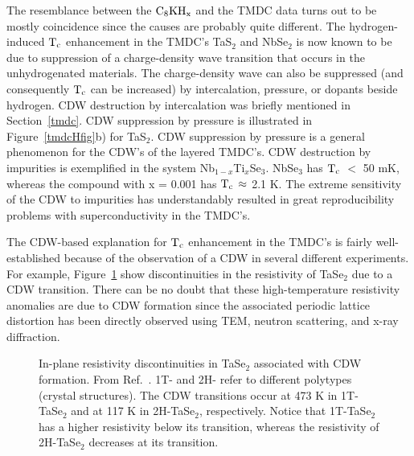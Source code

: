         The resemblance between the $\rm C_8KH_{x}$ and the TMDC data turns
out to be mostly coincidence since the causes are probably quite different.
The  hydrogen-induced  $\rm  T_c$ enhancement  in  the TMDC's  TaS$_2$  and
NbSe$_2$ is now  known to be  due to suppression of  a charge-density  wave
transition        that      occurs       in          the     unhydrogenated
materials.\cite{murphy75,friend79}  The charge-density  wave  can  also  be
suppressed (and consequently $\rm T_c$ can  be increased) by intercalation,
pressure,  or dopants  beside  hydrogen.\cite{friend79}  CDW destruction by
intercalation was briefly mentioned in Section~\ref{tmdc}.  CDW suppression
by pressure  is  illustrated  in Figure~\ref{tmdcHfig}b) for  TaS$_2$.  CDW
suppression  by pressure  is  a general phenomenon  for  the  CDW's  of the
layered TMDC's.\cite{friend79} CDW destruction by impurities is exemplified
in the system  Nb$_{1-x}$Ti$_x$Se$_3$.  NbSe$_3$ has  $\rm T_c$  $<$ 50 mK,
whereas  the compound  with  x  =  0.001 has   $\rm  T_c \,  \approx$   2.1
K.\cite{fuller81}  The  extreme sensitivity of   the CDW to impurities  has
understandably  resulted  in   great    reproducibility     problems   with
superconductivity in the TMDC's.\cite{fuller81}  

        The  CDW-based explanation for $\rm T_c$  enhancement in the TMDC's
is fairly well-established because of the  observation of a  CDW in several
different    experiments.    For   example,  Figure~\ref{tase2resist}  show
discontinuities    in   the   resistivity   of  TaSe$_2$     due  to a  CDW
transition.\cite{wilson74}     There    can    be  no   doubt    that these
high-temperature resistivity anomalies are due to CDW  formation  since the
associated periodic lattice  distortion   has been directly  observed using
TEM, neutron scattering, and x-ray diffraction.\cite{friend79,wilson74}

\begin{figure}
\vspace{15cm}
\caption[Resistivity discontinuities in TaSe$_2$ associated with CDW
formation]{In-plane resistivity discontinuities in TaSe$_2$ associated with
CDW formation.  From Ref.~\cite{wilson74}.   1T- and 2H- refer to different
polytypes (crystal  structures).  The CDW  transitions occur at  473  K  in
1T-TaSe$_2$ and   at 117   K in   2H-TaSe$_2$, respectively.  Notice   that
1T-TaSe$_2$  has   a higher  resistivity   below  its  transition,  whereas
the resistivity of 2H-TaSe$_2$ decreases at its transition.}
\label{tase2resist}
\end{figure}

